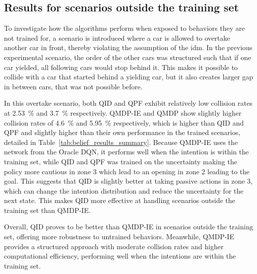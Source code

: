 \subsection{Results for scenarios outside the training set}
To investigate how the algorithms perform when exposed to behaviors they are not trained for, a scenario is introduced where a car is allowed to overtake another car in front, thereby violating the assumption of the \gls{idm}.
In the previous experimental scenario, the order of the other cars was structured such that if one car yielded, all following cars would stop behind it. This makes it possible to collide with a car that started behind a yielding car, but it also creates larger gap in between cars, that was not possible before. 

In this overtake scenario, both QID and QPF exhibit relatively low collision rates at \SI{2.53}{\percent} and \SI{3.7}{\percent} respectively. %
QMDP-IE and QMDP show slightly higher collision rates of \SI{4.6}{\percent} and \SI{5.95}{\percent} respectively, which is higher than QID and QPF and slightly higher than their own performance in the trained scenarios, detailed in Table~\ref{tab:belief_results_summary}. 
Because QMDP-IE uses the network from the Oracle DQN, it performs well when the intention is within the training set, while QID and QPF was trained on the uncertainty making the policy more cautious in zone 3 which lead to an opening in zone 2 leading to the goal. 
This suggests that QID is slightly better at taking passive actions in zone 3, which can change the intention distribution and reduce the uncertainty for the next state. This makes QID more effective at handling scenarios outside the training set than QMDP-IE.

Overall, QID proves to be better than QMDP-IE in scenarios outside the training set, offering more robustness to untrained behaviors. Meanwhile, QMDP-IE provides a structured approach with moderate collision rates and higher computational efficiency, performing well when the intentions are within the training set.

